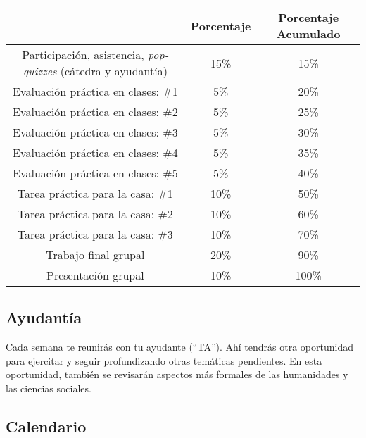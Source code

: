 \documentclass[letterpaper]{article}
\begin{document}
\begin{table}[h]
\begin{tabular}{ccc}
							& \textbf{Porcentaje} & {\bf Porcentaje Acumulado} \\
							\hline
Participaci\'on, asistencia, \emph{pop-quizzes} (c\'atedra y ayudant\'ia) & 15\%       & 15\%                 \\
\hline
Evaluaci\'on pr\'actica en clases: \#1 & 5\% & 20\%                 \\
Evaluaci\'on pr\'actica en clases: \#2 & 5\% & 25\%                 \\
Evaluaci\'on pr\'actica en clases: \#3 & 5\% & 30\%                 \\
Evaluaci\'on pr\'actica en clases: \#4 & 5\% & 35\%                 \\
Evaluaci\'on pr\'actica en clases: \#5 & 5\% & 40\%  \\
\hline
Tarea pr\'actica para la casa: \#1 	 & 10\% & 50\%    \\
Tarea pr\'actica para la casa: \#2 	 & 10\% & 60\%    \\
Tarea pr\'actica para la casa: \#3 	 & 10\% & 70\%    \\
\hline
Trabajo final grupal & 20\% & 90\% \\
Presentaci\'on grupal & 10\% & 100\% \\
\hline             
\end{tabular}
\end{table}

\subsection*{Ayudant\'ia}

Cada semana te reunir\'as con tu ayudante (``TA''). Ah\'i tendr\'as otra oportunidad para ejercitar y seguir profundizando otras tem\'aticas pendientes. En esta oportunidad, tambi\'en se revisar\'an aspectos m\'as formales de las humanidades y las ciencias sociales. 

\subsection*{Calendario}
\end{document}
